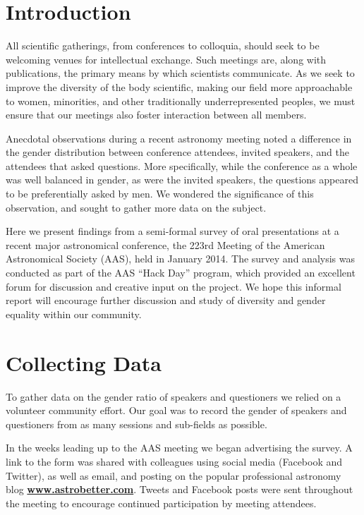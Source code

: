 \documentclass[iop]{emulateapj}
\begin{document}



\section{Introduction}
All scientific gatherings, from conferences to colloquia, should seek to be welcoming venues for intellectual exchange. Such meetings are, along with publications, the primary means by which scientists communicate. As we seek to improve the diversity of the body scientific, making our field more approachable to women, minorities, and other traditionally underrepresented peoples, we must ensure that our meetings also foster interaction between all members.

Anecdotal observations during a recent astronomy meeting noted a difference in the gender distribution  between conference attendees, invited speakers, and the attendees that asked questions. More specifically, while the conference as a whole was well balanced in gender, as were the invited speakers, the questions appeared to be preferentially asked by men. We wondered the significance of this observation, and sought to gather more data on the subject.

Here we present findings from a semi-formal survey of oral presentations at a recent major astronomical conference, the 223rd Meeting of the American Astronomical Society (AAS), held in January 2014. The survey and analysis was conducted as part of the AAS ``Hack Day'' program, which provided an excellent forum for discussion and creative input on the project. We hope this informal report will encourage further discussion and study of diversity and gender equality within our community.


\section{Collecting Data}
To gather data on the gender ratio of speakers and questioners we relied on a volunteer community effort. Our goal was to record the gender of speakers and questioners from as many sessions and sub-fields as possible. 

In the weeks leading up to the AAS meeting we began advertising the survey. A link to the form was shared with colleagues using social media (Facebook and Twitter), as well as email, and posting on the popular professional astronomy blog \href{http://www.astrobetter.com}{\bf{www.astrobetter.com}}. Tweets and Facebook posts were sent throughout the meeting to encourage continued participation by meeting attendees. 
\end{document}
